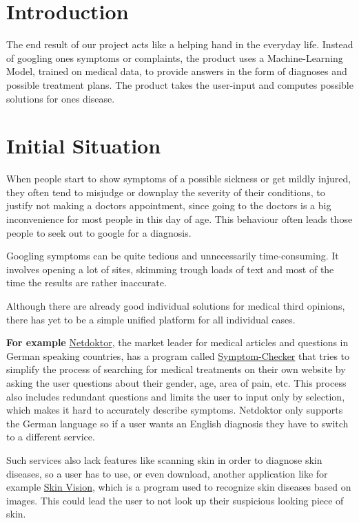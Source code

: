 \documentclass[12pt]{article}
\theoremstyle{definition}
\begin{document}
\pagebreak


\tableofcontents

\pagebreak


\section{Introduction}
The end result of our project acts like a helping hand in the everyday life.
Instead of googling ones symptoms or complaints, the product uses a Machine-Learning Model, trained on medical data, to provide answers in the form of diagnoses and possible treatment plans. The product takes the user-input and computes possible solutions for ones disease.

\pagebreak


\section{Initial Situation}

When people start to show symptoms of a possible sickness or get mildly injured, they often tend to misjudge or downplay the severity of their conditions, to justify not making a doctors appointment, since going to the doctors is a big inconvenience for most people in this day of age. This behaviour often leads those people to seek out to google for a diagnosis.

Googling symptoms can be quite tedious and unnecessarily time-consuming. It involves opening a lot of sites, skimming trough loads of text and most of the time the results are rather inaccurate.

Although there are already good individual solutions for medical third opinions, there has yet to be a simple unified platform for all individual cases.

{\bf For example} \href{https://www.netdoktor.de/}{Netdoktor}, the market leader for medical articles and questions in German speaking countries, has a program called \href{https://www.netdoktor.de/symptom-checker/}{Symptom-Checker} that tries to simplify the process of searching for medical treatments on their own website by asking the user questions about their gender, age, area of pain, etc. This process also includes redundant questions and limits the user to input only by selection, which makes it hard to accurately describe symptoms. Netdoktor only supports the German language so if a user wants an English diagnosis they have to switch to a different service.

Such services also lack features like scanning skin in order to diagnose skin diseases, so a user has to use, or even download, another application like for example \href{http://www.skinvision.com}{Skin Vision}, which is a program used to recognize skin diseases based on images. This could lead the user to not look up their suspicious looking piece of skin. 
\end{document}
